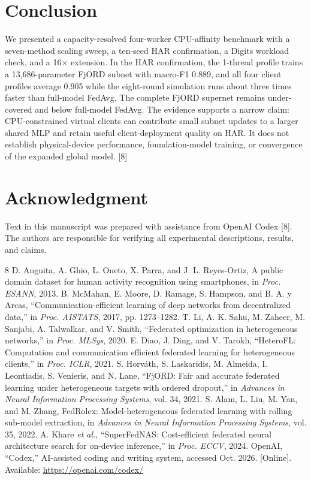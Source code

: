 \documentclass[conference]{IEEEtran}
\begin{document}
\section{Conclusion}
We presented a capacity-resolved four-worker CPU-affinity benchmark with a seven-method scaling sweep, a ten-seed HAR confirmation, a Digits workload check, and a 16$\times$ extension. In the HAR confirmation, the 1-thread profile trains a 13,686-parameter FjORD subnet with macro-F1 0.889, and all four client profiles average 0.905 while the eight-round simulation runs about three times faster than full-model FedAvg. The complete FjORD supernet remains under-covered and below full-model FedAvg. The evidence supports a narrow claim: CPU-constrained virtual clients can contribute small subnet updates to a larger shared MLP and retain useful client-deployment quality on HAR. It does not establish physical-device performance, foundation-model training, or convergence of the expanded global model. [8]

\section*{Acknowledgment}
Text in this manuscript was prepared with assistance from OpenAI Codex [8]. The authors are responsible for verifying all experimental descriptions, results, and claims.

\begin{thebibliography}{8}
 D. Anguita, A. Ghio, L. Oneto, X. Parra, and J. L. Reyes-Ortiz, A public domain dataset for human activity recognition using smartphones, in \emph{Proc. ESANN}, 2013.
 B. McMahan, E. Moore, D. Ramage, S. Hampson, and B. A. y Arcas, ``Communication-efficient learning of deep networks from decentralized data,'' in \emph{Proc. AISTATS}, 2017, pp. 1273--1282.
 T. Li, A. K. Sahu, M. Zaheer, M. Sanjabi, A. Talwalkar, and V. Smith, ``Federated optimization in heterogeneous networks,'' in \emph{Proc. MLSys}, 2020.
 E. Diao, J. Ding, and V. Tarokh, ``HeteroFL: Computation and communication efficient federated learning for heterogeneous clients,'' in \emph{Proc. ICLR}, 2021.
 S. Horv\'ath, S. Laskaridis, M. Almeida, I. Leontiadis, S. Venieris, and N. Lane, ``FjORD: Fair and accurate federated learning under heterogeneous targets with ordered dropout,'' in \emph{Advances in Neural Information Processing Systems}, vol. 34, 2021.
 S. Alam, L. Liu, M. Yan, and M. Zhang, FedRolex: Model-heterogeneous federated learning with rolling sub-model extraction, in \emph{Advances in Neural Information Processing Systems}, vol. 35, 2022.
 A. Khare \emph{et al.}, ``SuperFedNAS: Cost-efficient federated neural architecture search for on-device inference,'' in \emph{Proc. ECCV}, 2024.
 OpenAI, ``Codex,'' AI-assisted coding and writing system, accessed Oct. 2026. [Online]. Available: \url{https://openai.com/codex/}
\end{thebibliography}
\end{document}
